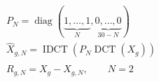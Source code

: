 \documentclass[border=7pt,varwidth=108mm]{standalone}
\begin{document}
\color{ink}\fontsize{15}{23}\selectfont
\[
\begin{gathered} P_N=\operatorname{diag}(\underbrace{1,\ldots,1}_{N},\underbrace{0,\ldots,0}_{30-N})\\ \widehat X_{g,N}=\operatorname{IDCT}\!\left(P_N\operatorname{DCT}(X_g)\right)\\ R_{g,N}=X_g-\widehat X_{g,N},\qquad N=2\end{gathered}
\]
\end{document}
